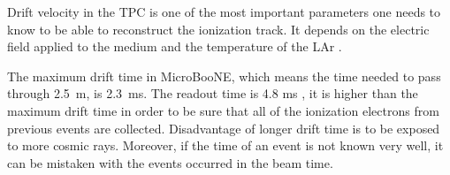\documentclass[a4paper]{article}\linespread{1.4}
\begin{document}
Drift velocity in the TPC is one of the most important parameters one needs to know to be able to reconstruct the ionization track. It depends on the electric field applied to the medium and the temperature of the LAr \cite{NKR}. 

The maximum drift time in MicroBooNE, which means the time needed to pass through 2.5~m, is 2.3~ms. The readout time is 4.8 ms \cite{1}, it is higher than the maximum drift time in order to be sure that all of the ionization electrons from previous events are collected. 
Disadvantage of longer drift time is to be exposed to more cosmic rays. Moreover, if the time of an event is not known very well, it can be mistaken with the events occurred in the beam time.

\end{document}
